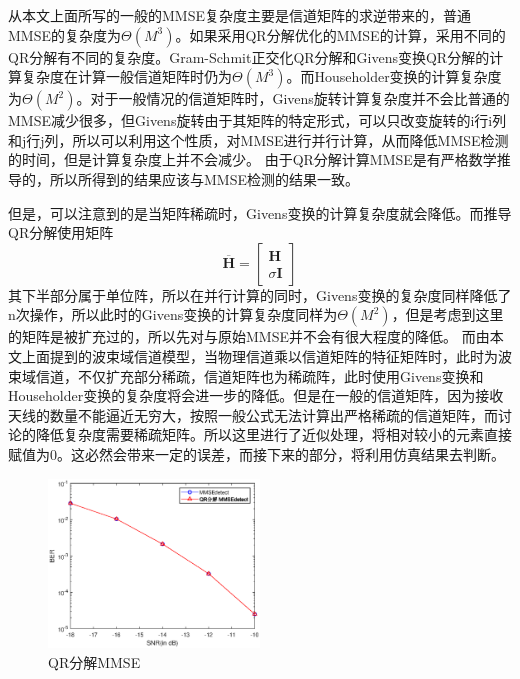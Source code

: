 \documentclass[bachelor,nocolorlinks, printoneside]{seuthesis} %
\begin{document}
\begin{Main}
从本文上面所写的一般的MMSE复杂度主要是信道矩阵的求逆带来的，普通MMSE的复杂度为$\Theta(M^3)$。如果采用QR分解优化的MMSE的计算，采用不同的QR分解有不同的复杂度。Gram-Schmit正交化QR分解和Givens变换QR分解的计算复杂度在计算一般信道矩阵时仍为$\Theta(M^3)$。而Householder变换的计算复杂度为$\Theta(M^2)$。对于一般情况的信道矩阵时，Givens旋转计算复杂度并不会比普通的MMSE减少很多，但Givens旋转由于其矩阵的特定形式，可以只改变旋转的i行i列和j行j列，所以可以利用这个性质，对MMSE进行并行计算，从而降低MMSE检测的时间，但是计算复杂度上并不会减少。
由于QR分解计算MMSE是有严格数学推导的，所以所得到的结果应该与MMSE检测的结果一致。

但是，可以注意到的是当矩阵稀疏时，Givens变换的计算复杂度就会降低。而推导QR分解使用矩阵
\begin{equation}\label{key}
\overline{\mathbf{H}} = \left[
\begin{array}{c}
\mathbf{H}\\
\sigma \mathbf{I}
\end{array} \right]
\end{equation}
其下半部分属于单位阵，所以在并行计算的同时，Givens变换的复杂度同样降低了n次操作，所以此时的Givens变换的计算复杂度同样为$\Theta(M^2)$，但是考虑到这里的矩阵是被扩充过的，所以先对与原始MMSE并不会有很大程度的降低。
而由本文上面提到的波束域信道模型，当物理信道乘以信道矩阵的特征矩阵时，此时为波束域信道，不仅扩充部分稀疏，信道矩阵也为稀疏阵，此时使用Givens变换和Householder变换的复杂度将会进一步的降低。但是在一般的信道矩阵，因为接收天线的数量不能逼近无穷大，按照一般公式无法计算出严格稀疏的信道矩阵，而讨论的降低复杂度需要稀疏矩阵。所以这里进行了近似处理，将相对较小的元素直接赋值为0。这必然会带来一定的误差，而接下来的部分，将利用仿真结果去判断。
\begin{figure}[htbp!]
	\centering \includegraphics[width=0.5\textwidth]{img/3_9.eps} \caption{QR分解MMSE}
\end{figure}


\end{Main}
\end{document}
